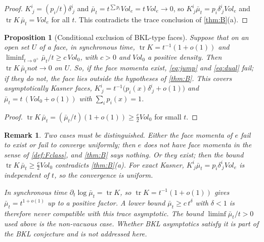 \documentclass[11pt]{article}
\theoremstyle{canonmath}
\newtheorem{remark}[theorem]{Remark}
\theoremstyle{canonpostulate}
\theoremstyle{canonproposition}
\theoremstyle{canonmath}
\newtheorem{proposition*}[theorem]{Proposition}
\theoremstyle{canonproposition}
\def\mathrm#1{#1}%
\def\not{not}%
\begin{document}
\begin{proof}
$K^i_{\ j} = (p_i/t)\delta^i_{\ j}$ and $\bar\mu_t = t^{\sum p_i}\mathrm{Vol}_e = t\,\mathrm{Vol}_e\to0$, so $K^i_{\ j}\bar\mu_t = p_i\delta^i_{\ j}\mathrm{Vol}_e$ and $\operatorname{tr}K\,\bar\mu_t = \mathrm{Vol}_e$ for all $t$. This contradicts the trace conclusion of \cref{thm:B}(a).
\end{proof}

\begin{proposition*}[Conditional exclusion of BKL-type faces]\label{prop:bkl}
Suppose that on an open set $U$ of a face, in synchronous time, $\operatorname{tr}K = t^{-1}(1+o(1))$ and $\liminf_{t\to0^+}\bar\mu_t/t\ge c\,\mathrm{Vol}_0$, with $c>0$ and $\mathrm{Vol}_0$ a positive density. Then $\operatorname{tr}K\,\bar\mu_t\not\to0$ on $U$. So, if the face momenta exist, \eqref{eq:jump} and \eqref{eq:dual} fail; if they do not, the face lies outside the hypotheses of \cref{thm:B}. This covers asymptotically Kasner faces, $K^i_{\ j} = t^{-1}\bigl(p_i(x)\delta^i_{\ j} + o(1)\bigr)$ and $\bar\mu_t = t\,(\mathrm{Vol}_0 + o(1))$ with $\sum_ip_i(x) = 1$.
\end{proposition*}

\begin{proof}
$\operatorname{tr}K\,\bar\mu_t = (\bar\mu_t/t)(1+o(1))\ge\tfrac c2\mathrm{Vol}_0$ for small $t$.
\end{proof}

\begin{remark}
Two cases must be distinguished. Either the face momenta of $e$ fail to exist or fail to converge uniformly; then $e$ does not have face momenta in the sense of \cref{def:Fclass}, and \cref{thm:B} says nothing. Or they exist; then the bound $\operatorname{tr}K\,\bar\mu_t\ge\tfrac c2\mathrm{Vol}_0$ contradicts \cref{thm:B}(a). For exact Kasner, $K^i_{\ j}\bar\mu_t = p_i\delta^i_{\ j}\mathrm{Vol}_e$ is independent of $t$, so the convergence is uniform.

In synchronous time $\partial_t\log\bar\mu_t = \operatorname{tr}K$, so $\operatorname{tr}K = t^{-1}(1+o(1))$ gives $\bar\mu_t = t^{1+o(1)}$ up to a positive factor. A lower bound $\bar\mu_t\ge c\,t^\delta$ with $\delta<1$ is therefore never compatible with this trace asymptotic. The bound $\liminf\bar\mu_t/t>0$ used above is the non-vacuous case. Whether BKL asymptotics \cite{BKL1970,BKL1982,Uggla2003} satisfy it is part of the BKL conjecture and is not addressed here.
\end{remark}
\end{document}

